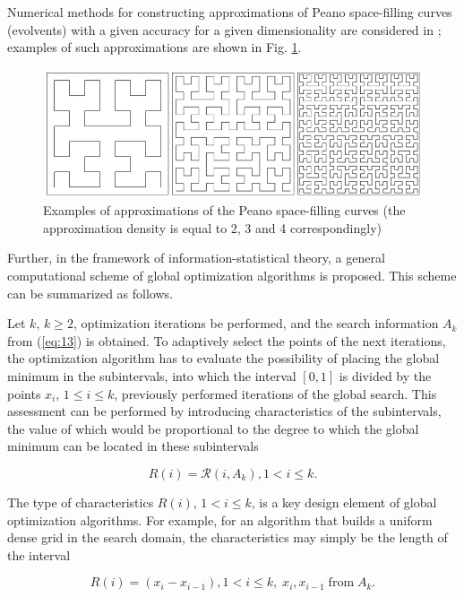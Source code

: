 \documentclass[review]{elsarticle}
\begin{document}
Numerical methods for constructing approximations of Peano space-filling curves (evolvents) with a given accuracy for a given dimensionality are considered in \cite{c5}; examples of such approximations are shown in Fig. \ref{fig:1}.

\begin{figure}
  \centering
  \includegraphics[width=\linewidth]{fig1}
  \caption{Examples of approximations of the Peano space-filling curves (the approximation density is equal to 2, 3 and 4 correspondingly) \cite{c5}}
  \label{fig:1}
\end{figure}

Further, in the framework of information-statistical theory, a general computational scheme of global optimization algorithms is proposed. This scheme can be summarized as follows.

Let $k$, $k \geq 2$, optimization iterations be performed, and the search information $A_k$ from (\ref{eq:13}) is obtained. To adaptively select the points of the next iterations, the optimization algorithm has to evaluate the possibility of placing the global minimum in the subintervals, into which the interval $[0,1]$ is divided by the points $x_i$, $1 \leq i \leq k$, previously performed iterations of the global search. This assessment can be performed by introducing characteristics of the subintervals, the value of which would be proportional to the degree to which the global minimum can be located in these subintervals

\begin{equation}\label{eq:15}
R(i)=\mathcal{R} (i,A_k ), 1 < i \leq k.
\end{equation}

The type of characteristics $R(i)$, $1 < i \leq k$, is a key design element of global optimization algorithms. For example, for an algorithm that builds a uniform dense grid in the search domain, the characteristics may simply be the length of the interval

\begin{equation}\label{eq:16}
R(i)=(x_i-x_{i-1}), 1 < i \leq k, \; x_i, x_{i-1} \; \mathrm{from} \; A_k.
\end{equation}
\end{document}
